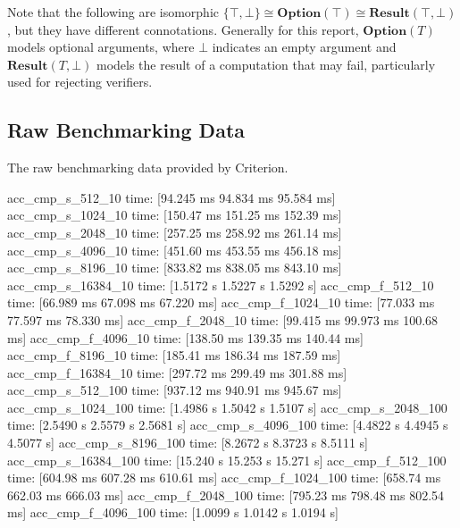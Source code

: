 \documentclass[
]{article}
\newenvironment{Shaded}{\begin{snugshade}}{\end{snugshade}}
\newcommand{\NormalTok}[1]{\textcolor[rgb]{0.16,0.16,0.16}{#1}}
\newcommand*\iso{\cong}
\newcommand*\Result{\mathbf{Result}}
\newcommand*\Option{\mathbf{Option}}
\begin{document}
Note that the following are isomorphic
\(\{ \top, \bot \} \iso \Option(\top) \iso
\Result(\top, \bot)\), but they have different connotations. Generally
for this report, \(\Option(T)\) models optional arguments, where
\(\bot\) indicates an empty argument and \(\Result(T, \bot)\) models the
result of a computation that may fail, particularly used for rejecting
verifiers.

\subsection{Raw Benchmarking Data}\label{raw-benchmarking-data}

The raw benchmarking data provided by Criterion.

\begin{Shaded}
\begin{Highlighting}[]
\NormalTok{  acc\_cmp\_s\_512\_10        time:   [94.245 ms 94.834 ms 95.584 ms]}
\NormalTok{  acc\_cmp\_s\_1024\_10       time:   [150.47 ms 151.25 ms 152.39 ms]}
\NormalTok{  acc\_cmp\_s\_2048\_10       time:   [257.25 ms 258.92 ms 261.14 ms]}
\NormalTok{  acc\_cmp\_s\_4096\_10       time:   [451.60 ms 453.55 ms 456.18 ms]}
\NormalTok{  acc\_cmp\_s\_8196\_10       time:   [833.82 ms 838.05 ms 843.10 ms]}
\NormalTok{  acc\_cmp\_s\_16384\_10      time:   [1.5172 s 1.5227 s 1.5292 s]}
\NormalTok{  acc\_cmp\_f\_512\_10        time:   [66.989 ms 67.098 ms 67.220 ms]}
\NormalTok{  acc\_cmp\_f\_1024\_10       time:   [77.033 ms 77.597 ms 78.330 ms]}
\NormalTok{  acc\_cmp\_f\_2048\_10       time:   [99.415 ms 99.973 ms 100.68 ms]}
\NormalTok{  acc\_cmp\_f\_4096\_10       time:   [138.50 ms 139.35 ms 140.44 ms]}
\NormalTok{  acc\_cmp\_f\_8196\_10       time:   [185.41 ms 186.34 ms 187.59 ms]}
\NormalTok{  acc\_cmp\_f\_16384\_10      time:   [297.72 ms 299.49 ms 301.88 ms]}
\NormalTok{  acc\_cmp\_s\_512\_100       time:   [937.12 ms 940.91 ms 945.67 ms]}
\NormalTok{  acc\_cmp\_s\_1024\_100      time:   [1.4986 s 1.5042 s 1.5107 s]}
\NormalTok{  acc\_cmp\_s\_2048\_100      time:   [2.5490 s 2.5579 s 2.5681 s]}
\NormalTok{  acc\_cmp\_s\_4096\_100      time:   [4.4822 s 4.4945 s 4.5077 s]}
\NormalTok{  acc\_cmp\_s\_8196\_100      time:   [8.2672 s 8.3723 s 8.5111 s]}
\NormalTok{  acc\_cmp\_s\_16384\_100     time:   [15.240 s 15.253 s 15.271 s]}
\NormalTok{  acc\_cmp\_f\_512\_100       time:   [604.98 ms 607.28 ms 610.61 ms]}
\NormalTok{  acc\_cmp\_f\_1024\_100      time:   [658.74 ms 662.03 ms 666.03 ms]}
\NormalTok{  acc\_cmp\_f\_2048\_100      time:   [795.23 ms 798.48 ms 802.54 ms]}
\NormalTok{  acc\_cmp\_f\_4096\_100      time:   [1.0099 s 1.0142 s 1.0194 s]}

\end{Highlighting}
\end{Shaded}
\end{document}
